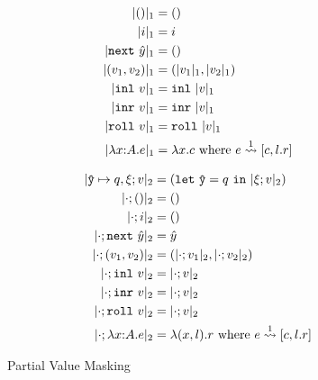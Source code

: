 %

\begin{figure*}
\centering
\begin{minipage}[]{10em}
\begin{align*}
&\\
\masko {()}			&= () \\
\masko {i}			&= i \\
\masko {\next~\hat y}	&= () \\
\masko {(v_1,v_2)}	&= (\masko {v_1},\masko {v_2}) \\
\masko {\inl~v}		&= \inl~\masko{v} \\
\masko {\inr~v}		&= \inr~\masko{v} \\
\masko {\roll~v}		&= \roll~\masko{v} \\
\masko {\lam xAe}		&= \lambda x.c \text{ where } \splitone e A {c,l.r}
\end{align*}
\end{minipage}
\qquad\qquad
\begin{minipage}[]{10em}
\begin{align*}
\maskt {\yhat \mapsto q,\xi;v}			&= (\letin \yhat q {\maskt{\xi;v}}) \\
\maskt {\cdot;()}			&= () \\
\maskt {\cdot;i}			&= () \\
\maskt {\cdot;\next~\hat y}	&= \hat y \\
\maskt {\cdot;(v_1,v_2)}	&= (\maskt {\cdot;v_1},\maskt {\cdot;v_2}) \\
\maskt {\cdot;\inl~v}		&= \maskt {\cdot;v} \\
\maskt {\cdot;\inr~v}		&= \maskt {\cdot;v} \\
\maskt {\cdot;\roll~v}		&= \maskt {\cdot;v} \\
\maskt {\cdot;\lam xAe}		&= \lambda (x,l).r \text{ where } \splitone e A {c,l.r}
\end{align*}
\end{minipage}
\caption{Partial Value Masking}
\label{fig:valMask}
\end{figure*}

